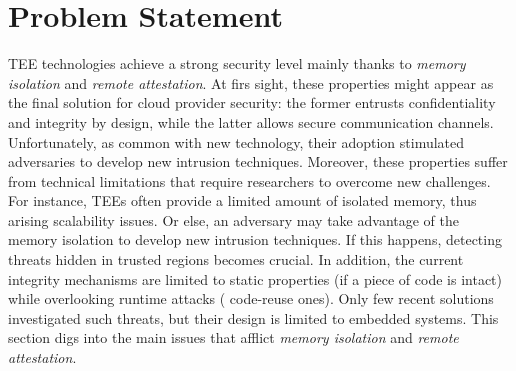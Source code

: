 %

\section{Problem Statement}

TEE technologies achieve a strong security level mainly thanks to
\emph{memory isolation} and \emph{remote attestation}.
At firs sight, these properties might appear as the final solution for 
cloud provider security: the former entrusts confidentiality and integrity by 
design, while the latter allows secure communication channels.
Unfortunately, as common with new technology, their adoption stimulated 
adversaries to develop new intrusion techniques.
Moreover, these properties suffer from technical limitations that require 
researchers to overcome new challenges.
For instance, TEEs often provide a limited amount of isolated memory, thus 
arising scalability issues.
Or else, an adversary may take advantage of the memory isolation to develop new 
intrusion techniques.
If this happens, detecting threats hidden in trusted regions becomes crucial.
In addition, the current integrity mechanisms are limited to static properties 
(\ie if a piece of code is intact) while overlooking runtime attacks (\eg 
code-reuse ones).
Only few recent solutions investigated such threats, but their design is 
limited to embedded systems.
This section digs into the main issues that afflict \emph{memory 
isolation} and \emph{remote attestation}.

